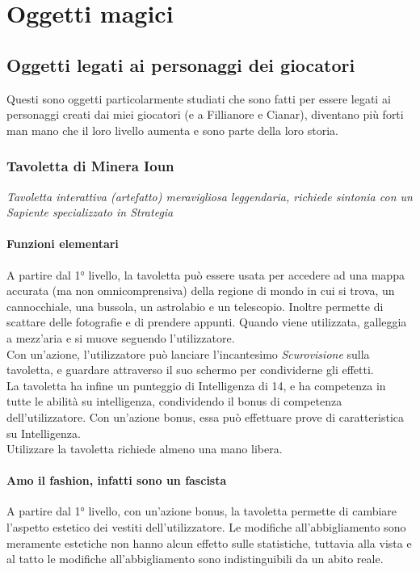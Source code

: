 
\chapter{Oggetti magici}

\section{Oggetti legati ai personaggi dei giocatori}

Questi sono oggetti particolarmente studiati che sono fatti per essere legati ai personaggi creati dai miei giocatori (e a Fillianore e Cianar), diventano più forti man mano che il loro livello aumenta e sono parte della loro storia.

\subsection{Tavoletta di Minera Ioun}
\textit{Tavoletta interattiva (artefatto) meravigliosa leggendaria, richiede sintonia con un Sapiente specializzato in Strategia}

\subsubsection{Funzioni elementari}
A partire dal 1° livello, la tavoletta può essere usata per accedere ad una mappa accurata (ma non omnicomprensiva) della regione di mondo in cui si trova, un cannocchiale, una bussola, un astrolabio e un telescopio. Inoltre permette di scattare delle fotografie e di prendere appunti. Quando viene utilizzata, galleggia a mezz'aria e si muove seguendo l'utilizzatore.\\ Con un'azione, l'utilizzatore può lanciare l'incantesimo \textit{Scurovisione} sulla tavoletta, e guardare attraverso il suo schermo per condividerne gli effetti.\\ La tavoletta ha infine un punteggio di Intelligenza di 14, e ha competenza in tutte le abilità su intelligenza, condividendo il bonus di competenza dell'utilizzatore. Con un'azione bonus, essa può effettuare prove di caratteristica su Intelligenza.\\ Utilizzare la tavoletta richiede almeno una mano libera.

\subsubsection{Amo il fashion, infatti sono un fascista}
A partire dal 1° livello, con un'azione bonus, la tavoletta permette di cambiare l'aspetto estetico dei vestiti dell'utilizzatore. Le modifiche all'abbigliamento sono meramente estetiche non hanno alcun effetto sulle statistiche, tuttavia alla vista e al tatto le modifiche all'abbigliamento sono indistinguibili da un abito reale.

